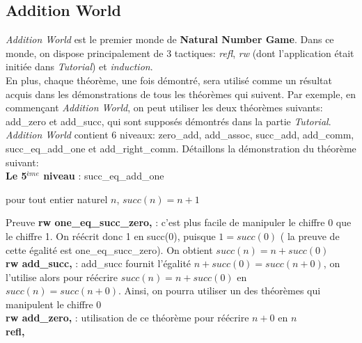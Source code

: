 \subsection{Addition World}
\textit{Addition World} est le premier monde de \textbf{Natural Number Game}. Dans ce monde, on dispose principalement de 3 tactiques: \textit{refl}, \textit{rw} (dont l'application était initiée dans \textit{Tutorial}) et \textit{induction}.\\
En plus, chaque théorème, une fois démontré, sera utilisé comme un résultat acquis dans les démonstrations de tous les théorèmes qui suivent. Par exemple, en commençant \textit{Addition World}, on peut utiliser les deux théorèmes suivants: add\_zero et add\_succ, qui sont supposés démontrés dans la partie \textit{Tutorial}.\\
\textit{Addition World} contient 6 niveaux: zero\_add, add\_assoc, succ\_add, add\_comm, succ\_eq\_add\_one et add\_right\_comm.
Détaillons la démonstration du théorème suivant:\\
\textbf{Le 5$^{ème}$ niveau} : succ\_eq\_add\_one \begin{center}  pour tout entier naturel $n$,  $succ(n)=n+1$ \end{center}
Preuve
\textbf{rw one\_eq\_succ\_zero,} : c'est plus facile de manipuler le chiffre 0 que le chiffre 1. On réécrit donc 1 en succ(0), puisque $1=succ(0)$ ( la preuve de cette égalité est one\_eq\_succ\_zero). On obtient $succ(n)=n+succ(0)$\\
 \textbf{rw add\_succ,} : add\_succ fournit l'égalité $n+succ(0)=succ(n+0)$, on l'utilise alors pour réécrire $succ(n)=n+succ(0)$ en $succ(n)=succ(n+0)$. Ainsi, on pourra utiliser un des théorèmes qui manipulent le chiffre 0\\
\textbf{rw add\_zero,} : utilisation de ce théorème pour réécrire $n+0$ en $n$\\
\textbf{refl,}
